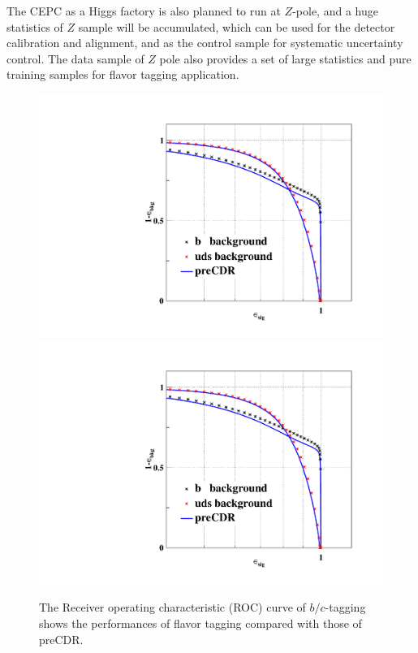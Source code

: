 The CEPC as a Higgs factory is also planned to run at $Z$-pole, and a huge statistics of $Z$ sample will be accumulated,
which can be used for the detector calibration and alignment, 
and as the control sample for systematic uncertainty control.
The data sample of $Z$ pole also provides a set of large statistics and pure training samples for flavor tagging application. 

\begin{figure}[h!]
\centering
\includegraphics[scale=0.40]{Figures/Performance/ft/CROC-test}
\includegraphics[scale=0.40]{Figures/Performance/ft/CROC-test}
\caption{The Receiver operating characteristic (ROC) curve of $b/c$-tagging shows the performances of flavor tagging compared with those of preCDR.  }
\label{fig:ft-roc}
\end{figure}

